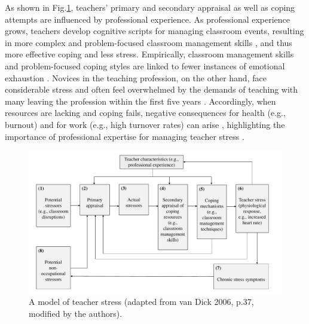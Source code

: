 \documentclass[preprint,
3p]{elsarticle} %
\begin{document}
As shown in Fig.\ref{fig.1}, teachers' primary and secondary appraisal
as well as coping attempts are influenced by professional experience. As
professional experience grows, teachers develop cognitive scripts for
managing classroom events, resulting in more complex and problem-focused
classroom management skills \citep{wolff2021classroom}, and thus more
effective coping and less stress. Empirically, classroom management
skills and problem-focused coping styles are linked to fewer instances
of emotional exhaustion \citep{maslach2001job, clunies2008self}. Novices
in the teaching profession, on the other hand, face considerable stress
and often feel overwhelmed by the demands of teaching
\citep{ophardt2017klassenmanagement, wolff2015keeping, klusmann2012berufliche}
with many leaving the profession within the first five years
\citep{ingersoll2003}. Accordingly, when resources are lacking and
coping fails, negative consequences for health (e.g., burnout) and for
work (e.g., high turnover rates) can arise
\citep{jalongo2006, unterbrink2007, aloe2014multivariate}, highlighting
the importance of professional expertise for managing teacher stress
\citep{fisher2011}.

\captionsetup[figure]{
    labelsep=colon,      %
    font=footnotesize,           %
    justification=justified, %
    singlelinecheck=false %
}

\captionsetup[table]{
    labelsep=colon,      %
    font=footnotesize,           %
    justification=justified, %
    singlelinecheck=false %
}

\begin{figure}[htbp]
  \centering
  \includegraphics[width=1\textwidth]{images/Model_Teacher_Stress_adapted_new.pdf}
  \caption{A model of teacher stress (adapted from van Dick 2006, p.37, modified by the authors).}
  \label{fig.1}
\end{figure}
\end{document}
